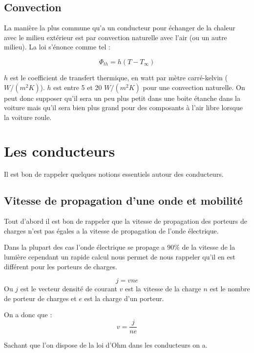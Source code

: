 \documentclass[12pt,a4paper]{article}
\begin{document}
\subsection{Convection}

La manière la plus commune qu'a un conducteur pour échanger de la chaleur avec le milieu extérieur est par convection naturelle avec l'air (ou un autre milieu). La loi s'énonce comme tel : 

\begin{equation}
\Phi_{th} = h( T - T_{\infty}  )
\end{equation}

$h$ est le coefficient de transfert thermique, en watt par mètre carré-kelvin ($W/(m^2 K)$). $h$ est entre 5 et 20 $W/(m^2 K)$ pour une convection naturelle. On peut donc supposer qu'il sera un peu plus petit dans une boite étanche dans la voiture mais qu'il sera bien plus grand pour des composants à l'air libre lorsque la voiture roule. 

\section{Les conducteurs}

Il est bon de rappeler quelques notions essentiels autour des conducteurs. 

\subsection{Vitesse de propagation d'une onde et mobilité}

Tout d'abord il est bon de rappeler que la vitesse de propagation des porteurs de charges n'est pas égales a la vitesse de propagation de l'onde électrique.

Dans la plupart des cas l'onde électrique se propage a $90\%$ de la vitesse de la lumière cependant un rapide calcul nous permet de nous rappeler qu'il en est différent pour les porteurs de charges. 

\begin{equation*}
j = v n e
\end{equation*}
Ou $j$ est le vecteur densité de courant $v$ est la vitesse de la charge $n$ est le nombre de porteur de charges et $e$ est la charge d'un porteur.

On a donc que : 
\begin{equation*}
v = \frac{j}{n e}
\end{equation*}

Sachant que l'on dispose de la loi d'Ohm dans les conducteurs on a.
\end{document}
